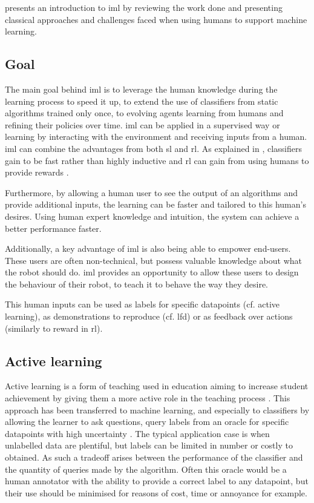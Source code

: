 \cite{amershi2014power} presents an introduction to \gls{iml} by reviewing the work done and presenting classical approaches and challenges faced when using humans to support machine learning.

\subsection{Goal}

The main goal behind \gls{iml} is to leverage the human knowledge during the learning process to speed it up, to extend the use of classifiers from static algorithms trained only once, to evolving agents learning from humans and refining their policies over time. \gls{iml} can be applied in a supervised way or learning by interacting with the environment and receiving inputs from a human. \gls{iml} can combine the advantages from both \gls{sl} and \gls{rl}. As explained in \cite{fails2003interactive}, classifiers gain to be fast rather than highly inductive and \gls{rl} can gain from using humans to provide rewards \citep{knox2009interactively}.

Furthermore, by allowing a human user to see the output of an algorithms and provide additional inputs, the learning can be faster and tailored to this human's desires. Using human expert knowledge and intuition, the system can achieve a better performance faster.

Additionally, a key advantage of \gls{iml} is also being able to empower end-users. These users are often non-technical, but possess valuable knowledge about what the robot should do. \gls{iml} provides an opportunity to allow these users to design the behaviour of their robot, to teach it to behave the way they desire.

This human inputs can be used as labels for specific datapoints (cf. active learning), as demonstrations to reproduce (cf. \gls{lfd}) or as feedback over actions (similarly to reward in \gls{rl}).

\subsection{Active learning} \label{ssec:back_active}

Active learning is a form of teaching used in education aiming to increase student achievement by giving them a more active role in the teaching process \citep{johnson1991active}. This approach has been transferred to machine learning, and especially to classifiers by allowing the learner to ask questions, query labels from an oracle for specific datapoints with high uncertainty \citep{settles2012active}. The typical application case is when unlabelled data are plentiful, but labels can be limited in number or costly to obtained. As such a tradeoff arises between the performance of the classifier and the quantity of queries made by the algorithm. Often this oracle would be a human annotator with the ability to provide a correct label to any datapoint, but their use should be minimised for reasons of cost, time or annoyance for example.

